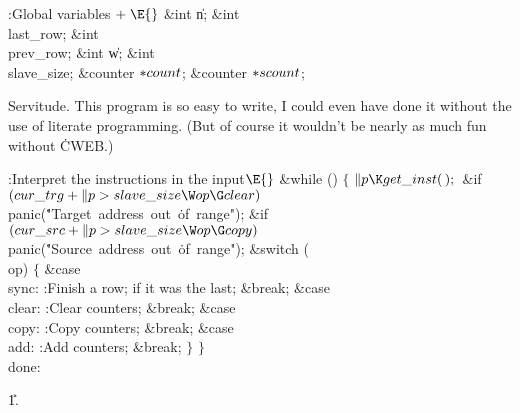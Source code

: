 \B{}:Global variables\X${}\mathrel+\E{}$\6
\&{int} \|n;\6
\&{int} \\{last\_row};\6
\&{int} \\{prev\_row};\6
\&{int} \|w;\6
\&{int} \\{slave\_size};\6
\&{counter} ${}{*}\\{count}{}$;\6
\&{counter} ${}{*}\\{scount}{}$;\par
\fi

Servitude. This program is so easy to write, I could
even have
done it without the use of literate programming. (But of course
it wouldn't be nearly as much fun without \.{CWEB}.)

\Y\B\4:Interpret the instructions in the input\X${}\E{}$\6
\&{while} ()\5
${}\{{}$\1\6
${}\|p\K\\{get\_inst}(\,);{}$\6
\&{if} ${}(\\{cur\_trg}+\|p>\\{slave\_size}\W\\{op}\G\\{clear}){}$\1\5
\\{panic}(\.{"Target\ address\ out\ }\)\.{of\ range"});\2\6
\&{if} ${}(\\{cur\_src}+\|p>\\{slave\_size}\W\\{op}\G\\{copy}){}$\1\5
\\{panic}(\.{"Source\ address\ out\ }\)\.{of\ range"});\2\6
\&{switch} (\\{op})\5
${}\{{}$\1\6
\4\&{case} \\{sync}:\5
:Finish a row;  if it was the last\X;\5
\&{break};\6
\4\&{case} \\{clear}:\5
:Clear  counters\X;\5
\&{break};\6
\4\&{case} \\{copy}:\5
:Copy  counters\X;\5
\&{break};\6
\4\&{case} \\{add}:\5
:Add  counters\X;\5
\&{break};\6
\4${}\}{}$\2\6
\4${}\}{}$\2\6
\4\\{done}:\par
\U1.\fi

